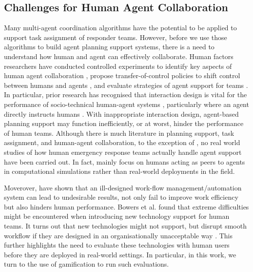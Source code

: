 \subsection{Challenges for Human Agent Collaboration}\label{sec:challenges}
Many multi-agent coordination algorithms have the potential to be applied to support task assignment of responder teams. However, before we use those algorithms to build agent planning support systems, there is a need to understand how human and agent can effectively collaborate.  Human factors researchers have conducted controlled experiments to identify key aspects of human agent collaboration \cite{Bradshaw2011,Cooke2006,Sukthankar,Wagner2004}, propose transfer-of-control policies to shift control between humans and agents \cite{scerri:etal:2005},  and evaluate strategies of agent support for teams \cite{Lenox2000}. In particular, prior research has recognised that interaction design is vital for the performance of socio-technical human-agent systems \cite{Rachlin1997}, particularly where an agent directly instructs humans \cite{Moran2013}. With inappropriate interaction design, agent-based planning support may function inefficiently, or at worst, hinder the performance of human teams. Although there is much literature in planning support, task assignment, and human-agent collaboration, to the exception of \cite{schurr2005defacto,scerri:etal:2003}, no real world studies of how human emergency response teams  actually handle agent support  have been carried out.  In fact, \cite{schurr2005defacto,scerri:etal:2003} mainly focus on humans acting as peers to agents in computational simulations rather than real-world deployments in the field.

Moverover, \cite{Bowers1994} have shown that an ill-designed work-flow management/automation system can lead to undesirable results, not only fail to improve work efficiency but also hinders human performance. Bowers et al. found that extreme difficulties might be encountered when introducing new technology support for human teams. It turns out that new technologies might not support, but  disrupt smooth workflow if they are designed in an organisationally unacceptable way \cite{Abbott1994}. This further highlights the need to evaluate these technologies with human users before they are deployed in real-world settings. In particular, in this work, we turn to the use of gamification to run such evaluations. 


